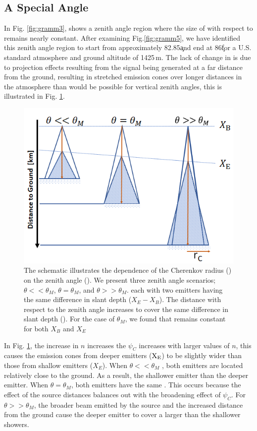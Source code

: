 \subsection{A Special Angle}
In Fig. \ref{fig:gramm3}, shows a zenith angle region where the size of \rc with respect to \x remains nearly constant. After examining Fig.\ref{fig:gramm5}, we have identified this zenith angle region to start from approximately 82.85\c and end at 86\c for a U.S. standard atmosphere and ground altitude of 1425\,m. The lack of change in \rc is due to projection effects resulting from the signal being generated at a far distance from the ground, resulting in stretched emission cones over longer distances in the atmosphere than would be possible for vertical zenith angles, this is illustrated in Fig. \ref{fig:magic_L}. 

\begin{figure}[ht!]
\includegraphics[width=\linewidth]{MagicA.png}
\caption{The schematic illustrates the dependence of the Cherenkov radius (\rc) on the zenith angle (\thet). We present three zenith angle scenarios; $\theta << \theta_M$, $\theta = \theta_M$, and $\theta >> \theta_M$. each with two emitters having the same difference in slant depth ($X_E-X_B$). The distance with respect to the zenith angle increases to cover the same difference in slant depth (\x). For the case of $\theta_M$, we found that \rc remains constant for both $X_B$ and $X_E$}
\label{fig:magic_L}
\end{figure}
In Fig. \ref{fig:magic_L}, the increase in $n$ increases the $\psi_C$ increases with larger values of $n$, this causes the emission cones from deeper emitters ($\rm X_E$) to be slightly wider than those from shallow emitters (\rm $X_E$). When $\theta << \theta_M$ , both emitters are located relatively close to the ground. As a result, the shallower emitter \rc than the deeper emitter. When $\theta = \theta_M$, both emitters have the same \rc. This occurs because the effect of the source distances balances out with the broadening effect of $\psi_C$. For $\theta >> \theta_M$, the broader beam emitted by the source and the increased distance from the ground cause the deeper emitter to cover a larger \rc than the shallower showers. 


